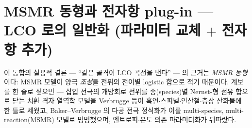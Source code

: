 \section{MSMR 동형과 전자항 plug-in --- LCO 로의 일반화 (파라미터 교체 $+$ 전자항 추가)}\label{sec:lco-code}
이 통합의 실용적 결론 --- ``같은 골격이 LCO 곡선을 낸다'' --- 의 근거는 \emph{MSMR 동형}이다:
MSMR 모델이 양극 \emph{조성}을 전위의 전이별 logistic 합으로 적기 때문이다. 계보를 한 줄로 짚으면 ---
삽입 전극의 개방회로 전위를 종(species)별 Nernst-형 점유 합으로 닫는 치환 격자 열역학 모델을 Verbrugge
등이 흑연$\cdot$스피넬$\cdot$인산철$\cdot$층상 산화물에 한 틀로 세웠고\cite{msmr_origin2017}, Baker--Verbrugge
의 다공 전극 정식화가 이를 multi-species, multi-reaction(MSMR) 모델로 명명했으며\cite{bakerverbrugge2018},
엔트로피$\cdot$온도 의존 파라미터화가 뒤따랐다\cite{msmr2024}.

